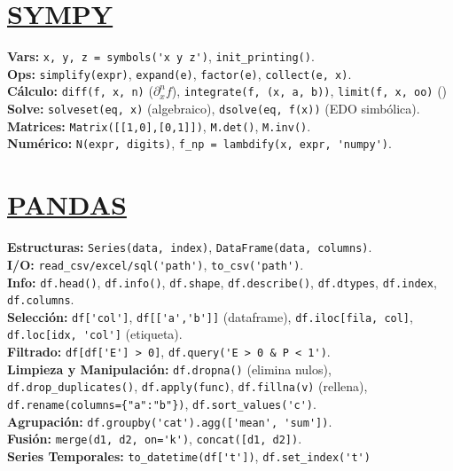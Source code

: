 \section{\href{https://www.sympy.org/en/index.html}{SYMPY} }
\textbf{Vars:} \verb|x, y, z = symbols('x y z')|, \texttt{init\_printing()}. \\
\textbf{Ops:} \texttt{simplify(expr)}, \texttt{expand(e)}, \texttt{factor(e)}, \texttt{collect(e, x)}. \\
\textbf{Cálculo:} \texttt{diff(f, x, n)} ($\partial_x^n f$), \texttt{integrate(f, (x, a, b))}, \texttt{limit(f, x, oo)} (\!\!\!) \\
\textbf{Solve:} \texttt{solveset(eq, x)} (algebraico), \texttt{dsolve(eq, f(x))} (EDO simbólica). \\
\textbf{Matrices:} \texttt{Matrix([[1,0],[0,1]])}, \texttt{M.det()}, \texttt{M.inv()}. \\
\textbf{Numérico:} \texttt{N(expr, digits)}, \verb|f_np = lambdify(x, expr, 'numpy')|.

\section{\href{https://pandas.pydata.org/}{PANDAS} }
\textbf{Estructuras:} \texttt{Series(data, index)}, \texttt{DataFrame(data, columns)}. \\
\textbf{I/O:} \verb|read_csv/excel/sql('path')|, \verb|to_csv('path')|. \\
\textbf{Info:} \texttt{df.head()},
\texttt{df.info()},
\texttt{df.shape},
\texttt{df.describe()}, \texttt{df.dtypes}, \texttt{df.index}, \texttt{df.columns}. \\
\textbf{Selección:} \verb|df['col']|, \verb|df[['a','b']]| (dataframe), \texttt{df.iloc[fila, col]}, \verb|df.loc[idx, 'col']| (etiqueta). \\
\textbf{Filtrado:} \verb|df[df['E'] > 0]|, \verb|df.query('E > 0 & P < 1')|. \\
\textbf{Limpieza y Manipulación:} \texttt{df.dropna()} (elimina nulos), \texttt{df.drop\_duplicates()}, 
\texttt{df.apply(func)},
\texttt{df.fillna(v)} (rellena), \texttt{df.rename(columns=\{"a":"b"\})}, \verb|df.sort_values('c')|. \\
\textbf{Agrupación:} \verb|df.groupby('cat').agg(['mean', 'sum'])|. \\
\textbf{Fusión:} \verb|merge(d1, d2, on='k')|, \texttt{concat([d1, d2])}.\\
\textbf{Series Temporales:} \verb|to_datetime(df['t'])|, \verb|df.set_index('t')|


